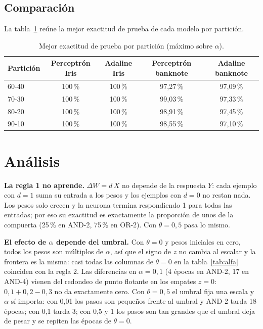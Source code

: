 \documentclass[11pt,letterpaper]{article}
\begin{document}
\subsection{Comparación}

La tabla~\ref{tab:comp} reúne la mejor exactitud de prueba de cada modelo por partición.

\begin{table}[H]
\centering
\caption{Mejor exactitud de prueba por partición (máximo sobre $\alpha$).}\label{tab:comp}
\begin{tabular}{lcccc}
\toprule
Partición & Perceptrón Iris & Adaline Iris & Perceptrón banknote & Adaline banknote \\
\midrule
60-40 & 100\,\% & 100\,\% & 97,27\,\% & 97,09\,\% \\
70-30 & 100\,\% & 100\,\% & 99,03\,\% & 97,33\,\% \\
80-20 & 100\,\% & 100\,\% & 98,91\,\% & 97,45\,\% \\
90-10 & 100\,\% & 100\,\% & 98,55\,\% & 97,10\,\% \\
\bottomrule
\end{tabular}
\end{table}

\section{Análisis}

\textbf{La regla 1 no aprende.} $\Delta W = d\,X$ no depende de la respuesta $Y$: cada ejemplo con $d = 1$ suma su entrada a los pesos y los ejemplos con $d = 0$ no restan nada. Los pesos solo crecen y la neurona termina respondiendo 1 para todas las entradas; por eso su exactitud es exactamente la proporción de unos de la compuerta (25\,\% en AND-2, 75\,\% en OR-2). Con $\theta = 0{,}5$ pasa lo mismo.

\textbf{El efecto de $\alpha$ depende del umbral.} Con $\theta = 0$ y pesos iniciales en cero, todos los pesos son múltiplos de $\alpha$, así que el signo de $z$ no cambia al escalar y la frontera es la misma: casi todas las columnas de $\theta = 0$ en la tabla~\ref{tab:alfa} coinciden con la regla 2. Las diferencias en $\alpha = 0{,}1$ (4 épocas en AND-2, 17 en AND-4) vienen del redondeo de punto flotante en los empates $z = 0$: $0{,}1 + 0{,}2 - 0{,}3$ no da exactamente cero. Con $\theta = 0{,}5$ el umbral fija una escala y $\alpha$ sí importa: con 0,01 los pasos son pequeños frente al umbral y AND-2 tarda 18 épocas; con 0,1 tarda 3; con 0,5 y 1 los pasos son tan grandes que el umbral deja de pesar y se repiten las épocas de $\theta = 0$.
\end{document}
